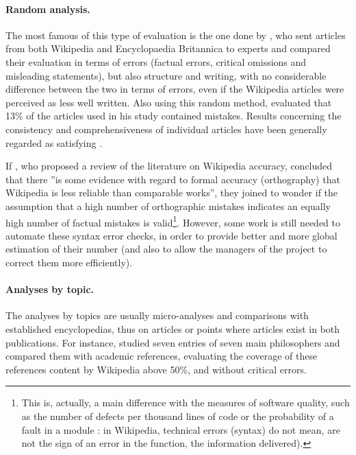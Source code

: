 \paragraph{Random analysis.}

The most famous of this type of evaluation is the one done by \citet{Giles05},
who sent articles from both Wikipedia and Encyclopaedia Britannica
to experts and compared their evaluation in terms of errors (factual
errors, critical omissions and misleading statements), but also structure
and writing, with no considerable difference between the two in terms
of errors, even if the Wikipedia articles were perceived as less well
written. Also using this random method, \citet{Chesney06} evaluated
that 13\% of the articles used in his study contained mistakes. Results
concerning the consistency and comprehensiveness of individual articles
have been generally regarded as satisfying \citep{Hammwohner07}. 

If \citet{Luytetal08}, who proposed a review of the literature on
Wikipedia accuracy, concluded that there ''is some evidence with
regard to formal accuracy (orthography) that Wikipedia is less reliable
than comparable works'', they joined \citet[p. 1668]{Fallis08} to
wonder if the assumption that a high number of orthographic mistakes
indicates an equally high number of factual mistakes is valid\footnote{This is, actually, a main difference with the measures of software
quality, such as the number of defects per thousand lines of code
\citep{DiazSligo97,Goranson97} or the probability of a fault in a
module \citep{Basili92,BasiliCalidieraRombach94}: in Wikipedia, technical
errors (syntax) do not mean, are not the sign of an error in the function,
the information delivered).}. However, some work is still needed to automate these syntax error
checks, in order to provide better and more global estimation of their
number (and also to allow the managers of the project to correct them
more efficiently).

\paragraph{Analyses by topic.}

The analyses by topics are usually micro-analyses and comparisons
with established encyclopedias, thus on articles or points where articles
exist in both publications. For instance, \citet{Bragues09} studied
seven entries of seven main philosophers and compared them with academic
references, evaluating the coverage of these references content by
Wikipedia above 50\%, and without critical errors.

